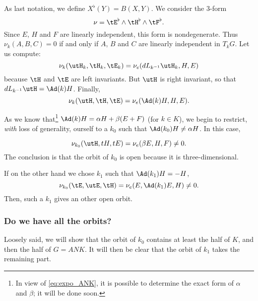As last notation, we define $X^{\flat}(Y)=B(X,Y)$. We consider the $3$-form
\[
	\nu=\tE^{\flat}\wedge\tH^{\flat}\wedge\tF^{\flat}.
\]
Since $E$, $H$ and $F$ are linearly independent, this form is nondegenerate. Thus $\nu_k(A,B,C)=0$ if and only if $A$, $B$ and $C$ are linearly independent in $T_kG$. Let us compute:
\[
	\nu_k(\utH_k,\tH_k,\tE_k)=\nu_e(dL_{k^{-1}}\utH_k,H,E)
\]
because $\tH$ and $\tE$ are left invariants. But $\utH$ is right invariant, so that $dL_{k^{-1}}\utH=\Ad(k)H$. Finally,
\begin{equation}
	\nu_k(\utH,\tH,\tE)=\nu_e(\Ad(k)H,H,E).
\end{equation}


As we know that\footnote{In view of \eqref{eq:expo_ANK}, it is possible to determine the exact form of $\alpha$ and $\beta$; it will be done soon.} $\Ad(k)H=\alpha H+\beta(E+F)$ (for $k\in K$), we begin to restrict, \emph{with} loss of generality,  ourself to a $k_0$ such that $\Ad(k_0)H\neq\alpha H$. In this case,

\begin{equation}
	\nu_{k_0}(\utH,tH,tE)=\nu_e(\beta E,H,F)\neq 0.
\end{equation}
The conclusion is that the orbit of $k_0$ is open because it is three-dimensional.

If on the other hand we chose $k_1$ such that $\Ad(k_1)H=-H$,
\[
	\nu_{k_0}(\tE,\utE,\tH)=\nu_e(E,\Ad(k_1)E,H)\neq 0.
\]
Then, such a $k_1$ gives an other open orbit.

\subsubsection{Do we have all the orbits?}

Loosely said, we will show that the orbit of $k_0$ contains at least the half of $K$, and then the half of $G=ANK$. It will then be clear that the orbit of $k_1$ takes the remaining part.

